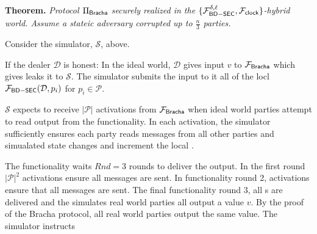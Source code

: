 {\bf Theorem.} {\em Protocol $\Pi_{{\mathsf {Bracha}}}$ securely realized \Fbc in the $\{\mathcal{F}_{{\mathsf {BD-SEC}}}^{\delta,\ell},\mathcal{F}_{{\mathsf {clock}}} \}$-hybrid world. Assume a stateic adversary corrupted up to $\frac{n}{3}$ parties.}

Consider the simulator, $\mathcal{S}$, above.

If the dealer $\mathcal{D}$ is honest: In the ideal world, $\mathcal{D}$ gives input $v$ to $\mathcal{F}_{{\mathsf {Bracha}}}$ which gives leaks it to $\mathcal{S}$.
The simulator submits the input to it all of the locl $\mathcal{F}_{{\mathsf {BD-SEC}}}(\mathcal{D},p_i)$ for $p_i \in  \mathcal{P}$.

$\mathcal{S}$ expects to receive $|\mathcal{P}|$ activations from $\mathcal{F}_{{\mathsf {Bracha}}}$ when ideal world parties attempt to read output from the functionality.
In each activation, the simulator sufficiently ensures each party reads messages from all other parties and simualated state changes and increment the local \Fclock.

The functionality waits $Rnd = 3$ rounds to deliver the output. In the first round $|\mathcal{P}|^2$ activations ensure all  messages are sent.
In functionality round 2, activations ensure that all  messages are sent. The final functionality round 3, all s are delivered and the simulates real world parties all output a value $v$.
By the proof of the Bracha protocol, all real world parties output the same value. The simulator instructs 


